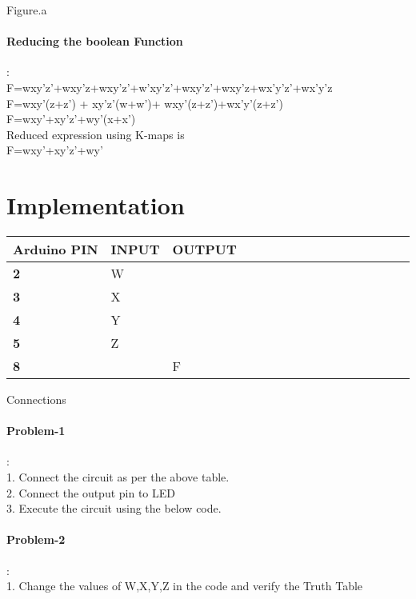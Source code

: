 \documentclass[10pt, a4paper]{article}
\begin{document}
    

\begin{center}
Figure.a
\end{center}
  

 \paragraph {Reducing the boolean Function}:\\
    F=wxy'z'+wxy'z+wxy'z'+w'xy'z'+wxy'z'+wxy'z+wx'y'z'+wx'y'z\\
    F=wxy'(z+z') + xy'z'(w+w')+ wxy'(z+z')+wx'y'(z+z')\\
    F=wxy'+xy'z'+wy'(x+x')\\
 Reduced expression using K-maps is\\
 F=wxy'+xy'z'+wy'\\

    
\section{Implementation}
  \begin{tabularx}{0.46\textwidth} { 
  | >{\centering\arraybackslash}X 
  | >{\centering\arraybackslash}X 
  | >{\centering\arraybackslash}X
  | >{\centering\arraybackslash}X 
  | >{\centering\arraybackslash}X 
  | >{\centering\arraybackslash}X 
  | >{\centering\arraybackslash}X 
  | >{\centering\arraybackslash}X 
  | >{\centering\arraybackslash}X
  | >{\centering\arraybackslash}X
  | >{\centering\arraybackslash}X
  | >{\centering\arraybackslash}X
  | >{\centering\arraybackslash}X
  | >{\centering\arraybackslash}X
  | >{\centering\arraybackslash}X 
  | >{\centering\arraybackslash}X | }


\hline
\textbf{Arduino PIN} & \textbf{INPUT} & \textbf{OUTPUT} \\ 
\hline
\textbf 2 & W & \\
\hline
\textbf 3 & X & \\
\hline
\textbf 4 & Y & \\
\hline
\textbf 5 & Z & \\
\hline
\textbf 8 & & F \\
\hline
\end{tabularx}

\begin{center}
    Connections
\end{center}

    \paragraph{Problem-1}:\\
    
    1. Connect the circuit as per the above table.\\
    2. Connect the output pin to LED\\
    3. Execute the circuit using the below code.\\

   \paragraph{Problem-2}:\\
1. Change the values of W,X,Y,Z in the code and verify the Truth Table\\



\end{document}
